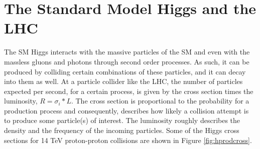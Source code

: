 
\section{The Standard Model Higgs and the LHC}

The SM Higgs interacts with the massive particles of the SM and even with the massless gluons and photons through second order processes. As such, it can be produced by colliding certain combinations of these particles, and it can decay into them as well. At a particle collider like the LHC, the number of particles expected per second, for a certain process, is given by the cross section times the luminosity, $R = \sigma_i*L$. The cross section is proportional to the probability for a production process and consequently, describes how likely a collision attempt is to produce some particle(s) of interest. The luminosity roughly describes the density and the frequency of the incoming particles. Some of the Higgs cross sections for 14 TeV proton-proton collisions are shown in Figure \ref{fig:hprodcross}. 

